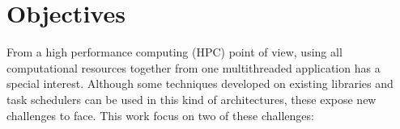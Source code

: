 

\section*{Objectives}
From a high performance computing (HPC) point of view, using all
computational resources together from one multithreaded application has a
special interest. Although some techniques developed on existing libraries
and task schedulers can be used in this kind of architectures, these expose
new challenges to face. This work focus on two of these challenges:



